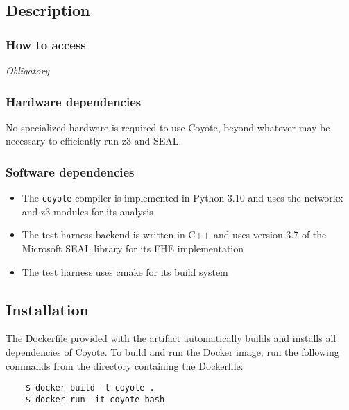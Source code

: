 \subsection{Description}

\subsubsection{How to access}

{\em Obligatory}

\subsubsection{Hardware dependencies}
No specialized hardware is required to use Coyote, beyond whatever may be necessary to efficiently run z3 and SEAL.

\subsubsection{Software dependencies}
\begin{itemize}
    \item The {\tt coyote} compiler is implemented in Python 3.10 and uses the networkx and z3 modules for its analysis
    \item The test harness backend is written in C++ and uses version 3.7 of the Microsoft SEAL library for its FHE implementation
    \item The test harness uses cmake for its build system
\end{itemize}

\subsection{Installation}

The Dockerfile provided with the artifact automatically builds and installs all dependencies of Coyote. To build and run the Docker image, run the following commands from the directory containing the Dockerfile:

\begin{verbatim}
    $ docker build -t coyote .
    $ docker run -it coyote bash
\end{verbatim}

